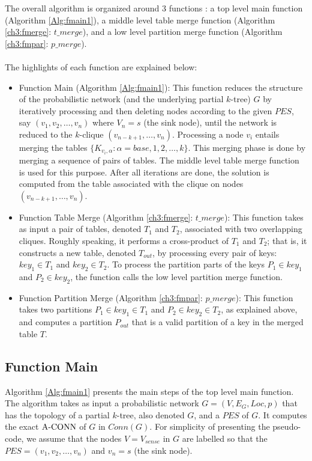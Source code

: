 The overall algorithm is organized around $3$ functions : a top level main function (Algorithm \ref{Alg:fmain1}), a middle level table merge function (Algorithm \ref{ch3:fmerge}: $t\_merge$), and a low level partition merge function (Algorithm \ref{ch3:fmpar}: $p\_merge$).\\\\
%
The highlights of each function are explained below:
\begin{itemize}
\item Function Main (Algorithm \ref{Alg:fmain1}): This function reduces the structure of the probabilistic network (and the underlying partial $k$-tree) $G$ by iteratively  processing and then deleting nodes according to the given $PES$, say $(v_1, v_2, \ldots, v_n)$ where $V_n=s$ (the sink node), until the network is reduced to the $k$-clique $(v_{n-k+1}, \ldots, v_n)$. Processing a node $v_i$ entails merging the tables $\{K_{v_i,\alpha} :\alpha=base, 1, 2, \ldots, k\}$.
This merging phase is done by merging a sequence of pairs of tables. The middle level table merge function is used for this purpose.
%
After all iterations are done, the solution is computed from the table associated with the clique on nodes $(v_{n-k+1}, \ldots, v_n)$.
\item Function Table Merge (Algorithm \ref{ch3:fmerge}: $t\_merge$): This function takes as input a pair of tables, denoted $T_1$ and $T_2$, associated with two overlapping cliques. Roughly speaking, it performs a cross-product of $T_1$ and $T_2$; that is, it constructs a new table, denoted $T_{out}$, by processing every pair of keys: $key_1\in T_1$ and $key_2\in T_2$. To process the partition parts of the keys $P_1 \in key_1$ and $P_2 \in key_2$, the function calls the low level partition merge function.
\item Function Partition Merge (Algorithm \ref{ch3:fmpar}: $p\_merge$): This function takes two partitions $P_1 \in key_1 \in T_1$ and $P_2 \in key_2 \in T_2$, as explained above, and computes a partition $P_{out}$ that is a valid partition of a key in the merged table $T$.
\end{itemize} 
\subsection{Function Main}
\label{subsub:Main}

Algorithm \ref{Alg:fmain1} presents the main steps of the top level main function. The algorithm takes as input a probabilistic network $G=(V, E_G, Loc, p)$ that has the topology of a partial $k$-tree, also denoted $G$, and a $PES$ of $G$. It computes the exact ${\mathrm {A\mbox{-}CONN}}$ of $G$ in $Conn(G)$. For simplicity of presenting the pseudo-code, we assume that the nodes $V=V_{sense}$ in $G$ are labelled so that the $PES=(v_1, v_2, \ldots, v_n)$ and $v_n=s$ (the sink node).

